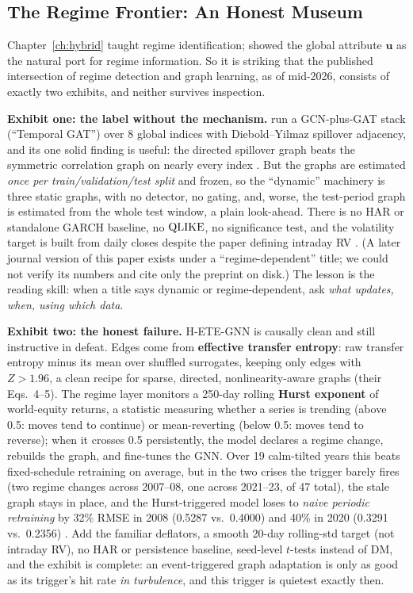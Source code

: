 \subsection{The Regime Frontier: An Honest Museum}\label{sec:gnn:regime}

Chapter~\ref{ch:hybrid} taught regime identification;  showed the global attribute $\mathbf{u}$ as the natural port for regime information. So it is striking that the published intersection of regime detection and graph learning, as of mid-2026, consists of exactly two exhibits, and neither survives inspection.

\textbf{Exhibit one: the label without the mechanism.} \citet{KumarUmeorahAlochukwu2024} run a GCN-plus-GAT stack (``Temporal GAT'') over 8 global indices with Diebold--Yilmaz spillover adjacency, and its one solid finding is useful: the directed spillover graph beats the symmetric correlation graph on nearly every index \citep[Table~2, p.~15]{KumarUmeorahAlochukwu2024}. But the graphs are estimated \emph{once per train/validation/test split} and frozen, so the ``dynamic'' machinery is three static graphs, with no detector, no gating, and, worse, the test-period graph is estimated from the whole test window, a plain look-ahead. There is no HAR or standalone GARCH baseline, no $\operatorname{QLIKE}$, no significance test, and the volatility target is built from daily closes despite the paper defining intraday RV \citep[pp.~10--13]{KumarUmeorahAlochukwu2024}. (A later journal version of this paper exists under a ``regime-dependent'' title; we could not verify its numbers and cite only the preprint on disk.) The lesson is the reading skill: when a title says dynamic or regime-dependent, ask \emph{what updates, when, using which data}.

\textbf{Exhibit two: the honest failure.} H-ETE-GNN \citep{LeeCho2025} is causally clean and still instructive in defeat. Edges come from \textbf{effective transfer entropy}: raw transfer entropy minus its mean over shuffled surrogates, keeping only edges with $Z > 1.96$, a clean recipe for sparse, directed, nonlinearity-aware graphs (their Eqs.~4--5). The regime layer monitors a 250-day rolling \textbf{Hurst exponent} of world-equity returns, a statistic measuring whether a series is trending (above 0.5: moves tend to continue) or mean-reverting (below 0.5: moves tend to reverse); when it crosses 0.5 persistently, the model declares a regime change, rebuilds the graph, and fine-tunes the GNN. Over 19 calm-tilted years this beats fixed-schedule retraining on average, but in the two crises the trigger barely fires (two regime changes across 2007--08, one across 2021--23, of 47 total), the stale graph stays in place, and the Hurst-triggered model loses to \emph{naive periodic retraining} by 32\% RMSE in 2008 (0.5287 vs.\ 0.4000) and 40\% in 2020 (0.3291 vs.\ 0.2356) \citep[Table~10, p.~22; \S3.1, p.~18]{LeeCho2025}. Add the familiar deflators, a smooth 20-day rolling-std target (not intraday RV), no HAR or persistence baseline, seed-level $t$-tests instead of DM, and the exhibit is complete: an event-triggered graph adaptation is only as good as its trigger's hit rate \emph{in turbulence}, and this trigger is quietest exactly then.

